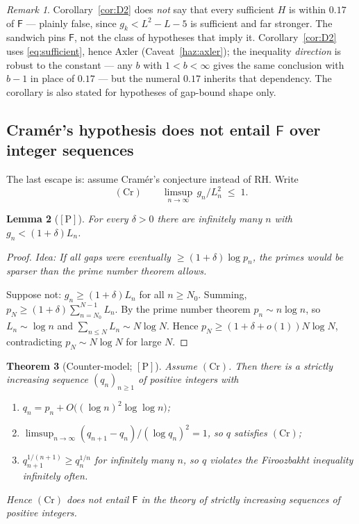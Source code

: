 \documentclass[11pt,a4paper]{article}
\theoremstyle{plain}
\newtheorem{theorem}{Theorem}[section]
\newtheorem{lemma}[theorem]{Lemma}
\theoremstyle{definition}
\theoremstyle{remark}
\newtheorem{remark}[theorem]{Remark}
\newcommand{\idea}[1]{\emph{Idea: #1}\par\smallskip}
\newcommand{\cP}{{[\mathrm{P}]}}
\newcommand{\Fb}{\mathsf{F}}
\newcommand{\limsupn}{\limsup_{n\to\infty}}
\begin{document}
\begin{remark}
Corollary~\ref{cor:D2} does \emph{not} say that every sufficient $H$ is within $0.17$ of
$\Fb$ --- plainly false, since $g_k < L^2 - L - 5$ is sufficient and far stronger. The
sandwich pins $\Fb$, not the class of hypotheses that imply it. Corollary~\ref{cor:D2} uses
\eqref{eq:sufficient}, hence Axler (Caveat~\ref{haz:axler}); the inequality \emph{direction}
is robust to the constant --- any $b$ with $1 < b < \infty$ gives the same conclusion with
$b - 1$ in place of $0.17$ --- but the numeral $0.17$ inherits that dependency. The
corollary is also stated for hypotheses of gap-bound shape only.
\end{remark}

\subsection{Cram\'er's hypothesis does not entail $\Fb$ over integer sequences}

The last escape is: assume Cram\'er's conjecture instead of RH. Write
\begin{equation}
\label{eq:Cr}
(\mathrm{Cr}) \qquad \limsupn\, g_n / L_n^2 \;\le\; 1 .
\end{equation}

\begin{lemma}[$\cP$]
\label{lem:E1}
For every $\delta > 0$ there are infinitely many $n$ with $g_n < (1+\delta)L_n$.
\end{lemma}

\begin{proof}
\idea{If all gaps were eventually $\ge (1+\delta)\log p_n$, the primes would be sparser than
the prime number theorem allows.}
Suppose not: $g_n \ge (1+\delta)L_n$ for all $n \ge N_0$. Summing,
$p_N \ge (1+\delta)\sum_{n=N_0}^{N-1} L_n$. By the prime number theorem $p_n \sim n\log n$,
so $L_n \sim \log n$ and $\sum_{n \le N} L_n \sim N\log N$. Hence
$p_N \ge (1 + \delta + o(1))N\log N$, contradicting $p_N \sim N\log N$ for large $N$.
\end{proof}

\begin{theorem}[Counter-model; $\cP$]
\label{thm:E}
Assume $(\mathrm{Cr})$. Then there is a strictly increasing sequence $(q_n)_{n\ge1}$ of
positive integers with
\begin{enumerate}
\item $q_n = p_n + O\bigl((\log n)^2 \log\log n\bigr)$;
\item $\limsupn (q_{n+1}-q_n)/(\log q_n)^2 = 1$, so $q$ satisfies $(\mathrm{Cr})$;
\item $q_{n+1}^{1/(n+1)} \ge q_n^{1/n}$ for infinitely many $n$, so $q$ violates the
  Firoozbakht inequality infinitely often.
\end{enumerate}
Hence $(\mathrm{Cr})$ does not entail $\Fb$ in the theory of strictly increasing sequences of
positive integers.
\end{theorem}
\end{document}
